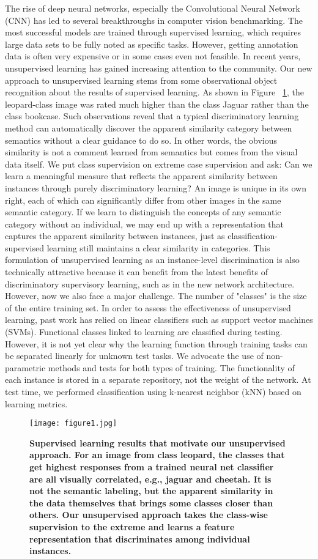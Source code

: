 \documentclass[a4paper,12pt]{article}
\begin{document}
 The rise of deep neural networks, especially the Convolutional Neural Network (CNN) has led to several breakthroughs in computer vision benchmarking. The most successful models are trained through supervised learning, which requires large data sets to be fully noted as specific tasks. However, getting annotation data is often very expensive or in some cases even not feasible. In recent years, unsupervised learning has gained increasing attention to the community\cite{Doersch_2015_Unsupervised}. Our new approach to unsupervised learning stems from some observational object recognition about the results of supervised learning. As shown in Figure ~\ref{pic1}, the leopard-class image was rated much higher than the class Jaguar rather than the class bookcase. Such observations reveal that a typical discriminatory learning method can automatically discover the apparent similarity category between semantics without a clear guidance to do so. In other words, the obvious similarity is not a comment learned from semantics but comes from the visual data itself. We put class supervision on extreme case supervision and ask: Can we learn a meaningful measure that reflects the apparent similarity between instances through purely discriminatory learning? An image is unique in its own right, each of which can significantly differ from other images in the same semantic category. If we learn to distinguish the concepts of any semantic category without an individual, we may end up with a representation that captures the apparent similarity between instances, just as classification-supervised learning still maintains a clear similarity in categories. This formulation of unsupervised learning as an instance-level discrimination is also technically attractive because it can benefit from the latest benefits of discriminatory supervisory learning, such as in the new network architecture. However, now we also face a major challenge. The number of "classes" is the size of the entire training set. In order to assess the effectiveness of unsupervised learning, past work has relied on linear classifiers such as support vector machines (SVMs). Functional classes linked to learning are classified during testing. However, it is not yet clear why the learning function through training tasks can be separated linearly for unknown test tasks. We advocate the use of non-parametric methods and tests for both types of training. The functionality of each instance is stored in a separate repository, not the weight of the network. At test time, we performed classification using k-nearest neighbor (kNN) based on learning metrics.
 \begin{figure}[htp]
 	\centering
 	\texttt{[image: figure1.jpg]}
 	\caption{\bfseries{ Supervised learning results that motivate our unsupervised
 			approach. For an image from class leopard, the classes that
 			get highest responses from a trained neural net classifier are all
 			visually correlated, e.g., jaguar and cheetah. It is not the semantic
 			labeling, but the apparent similarity in the data themselves that
 			brings some classes closer than others. Our unsupervised approach
 			takes the class-wise supervision to the extreme and learns a feature
 			representation that discriminates among individual instances.
 }}\label{pic1}
 \end{figure}
\end{document}
